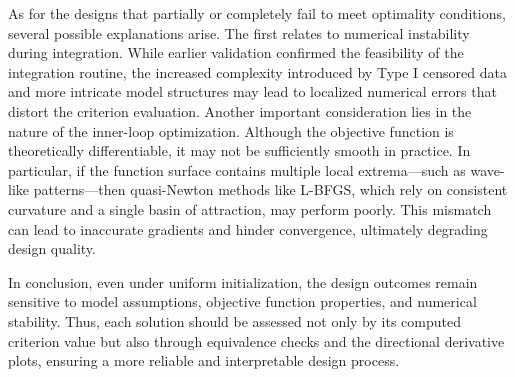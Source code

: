 \hspace*{8mm} As for the designs that partially or completely fail to meet optimality conditions, several possible explanations arise. The first relates to numerical instability during integration. While earlier validation confirmed the feasibility of the integration routine, the increased complexity introduced by Type I censored data and more intricate model structures may lead to localized numerical errors that distort the criterion evaluation. Another important consideration lies in the nature of the inner-loop optimization. Although the objective function is theoretically differentiable, it may not be sufficiently smooth in practice. In particular, if the function surface contains multiple local extrema—such as wave-like patterns—then quasi-Newton methods like L-BFGS, which rely on consistent curvature and a single basin of attraction, may perform poorly. This mismatch can lead to inaccurate gradients and hinder convergence, ultimately degrading design quality.

\hspace*{8mm} In conclusion, even under uniform initialization, the design outcomes remain sensitive to model assumptions, objective function properties, and numerical stability. Thus, each solution should be assessed not only by its computed criterion value but also through equivalence checks and the directional derivative plots, ensuring a more reliable and interpretable design process.

\newpage

